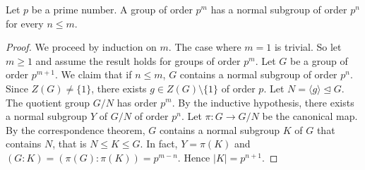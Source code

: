 \begin{theorem}
    Let $p$ be a prime number. 
    A group of order $p^m$ has a normal subgroup of order
    $p^n$ for every $n\leq m$.
\end{theorem}

\begin{proof}
    We proceed by induction on $m$. The case where $m=1$ is trivial. So let $m\geq1$ and 
    assume the result holds for groups of order $p^m$. Let
    $G$ be a group of order $p^{m+1}$.
    We claim that if $n\leq m$, $G$ contains a normal subgroup of
    order $p^n$. Since $Z(G)\ne\{1\}$, there exists
    $g\in Z(G)\setminus\{1\}$ of order $p$. Let
$N=\langle g\rangle\unlhd G$. The quotient 
group $G/N$ has order $p^m$. By the inductive hypothesis, 
there exists a normal subgroup $Y$ of $G/N$ of order $p^n$. Let 
$\pi\colon G\to G/N$ be the canonical map. 
By the correspondence theorem, $G$ contains a normal subgroup $K$ of $G$ 
that contains $N$, that is $N\leq K\leq G$. In fact, 
$Y=\pi(K)$ and 
$(G:K)=(\pi(G):\pi(K))=p^{m-n}$. Hence $|K|=p^{n+1}$.
\end{proof}


